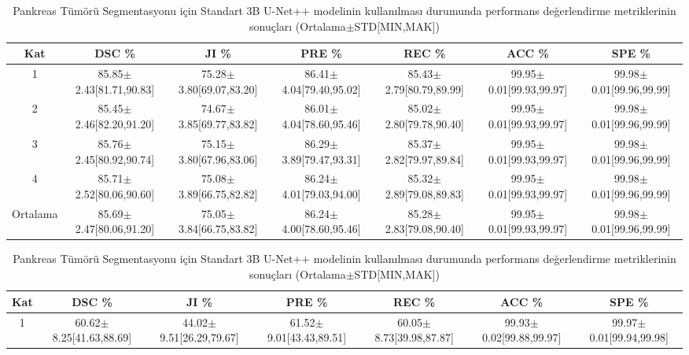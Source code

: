 \begin{table}
	\centering
	\caption{Pankreas Segmentasyonu için Standart 3B U-Net++ modelinin kullanılması durumunda performans değerlendirme metriklerinin sonuçları (Ortalama$\pm$STD[MIN,MAK])}
	\label{tab:p2unet++p}
	\begin{adjustbox}{width=\textwidth}		
		\begin{tabular}{ccccccc}
			\toprule
			Kat   &  DSC \%       &  JI  \%   &  PRE  \%   &  REC  \%  & ACC  \%  &  SPE  \% \\ 
			\midrule 
			1 & 85.85$\pm$2.43[81.71,90.83] & 75.28$\pm$3.80[69.07,83.20] & 86.41$\pm$4.04[79.40,95.02] & 85.43$\pm$2.79[80.79,89.99] & 99.95$\pm$0.01[99.93,99.97] & 99.98$\pm$0.01[99.96,99.99] \\
			2 & 85.45$\pm$2.46[82.20,91.20] & 74.67$\pm$3.85[69.77,83.82] & 86.01$\pm$4.04[78.60,95.46] & 85.02$\pm$2.80[79.78,90.40] & 99.95$\pm$0.01[99.93,99.97] & 99.98$\pm$0.01[99.96,99.99] \\
			3 & 85.76$\pm$2.45[80.92,90.74] & 75.15$\pm$3.80[67.96,83.06] & 86.29$\pm$3.89[79.47,93.31] & 85.37$\pm$2.82[79.97,89.84] & 99.95$\pm$0.01[99.93,99.97] & 99.98$\pm$0.01[99.96,99.99] \\
			4 & 85.71$\pm$2.52[80.06,90.60] & 75.08$\pm$3.89[66.75,82.82] & 86.24$\pm$4.01[79.03,94.00] & 85.32$\pm$2.89[79.08,89.83] & 99.95$\pm$0.01[99.93,99.97] & 99.98$\pm$0.01[99.96,99.99] \\
			\toprule
			Ortalama & 85.69$\pm$2.47[80.06,91.20] & 75.05$\pm$3.84[66.75,83.82] & 86.24$\pm$4.00[78.60,95.46] & 85.28$\pm$2.83[79.08,90.40] & 99.95$\pm$0.01[99.93,99.97] & 99.98$\pm$0.01[99.96,99.99] \\						
			\bottomrule			
		\end{tabular}
	\end{adjustbox}
	\vspace{2\baselineskip}
	\caption{Pankreas Tümörü Segmentasyonu için Standart 3B U-Net++ modelinin kullanılması durumunda performans değerlendirme metriklerinin sonuçları (Ortalama$\pm$STD[MIN,MAK])}
	\label{tab:p2unet++t}
	\begin{adjustbox}{width=\textwidth}		
		\begin{tabular}{ccccccc}
			\toprule
			Kat   &  DSC \%       &  JI  \%   &  PRE  \%   &  REC  \%  & ACC  \%  &  SPE  \% \\ 
			\midrule 
			1 & 60.62$\pm$8.25[41.63,88.69] & 44.02$\pm$9.51[26.29,79.67] & 61.52$\pm$9.01[43.43,89.51] & 60.05$\pm$8.73[39.98,87.87] & 99.93$\pm$0.02[99.88,99.97] & 99.97$\pm$0.01[99.94,99.98] \\

\end{tabular}
\end{adjustbox}
\end{table}
